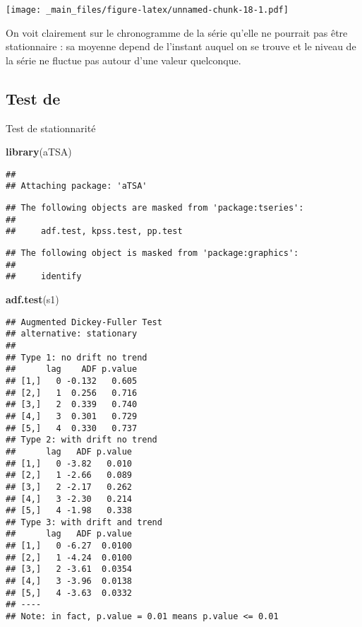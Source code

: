 \documentclass[
]{book}
\newenvironment{Shaded}{\begin{snugshade}}{\end{snugshade}}
\newcommand{\FunctionTok}[1]{\textcolor[rgb]{0.13,0.29,0.53}{\textbf{#1}}}
\newcommand{\NormalTok}[1]{#1}
\theoremstyle{definition}
\theoremstyle{definition}
\theoremstyle{definition}
\theoremstyle{definition}
\theoremstyle{remark}
\begin{document}
\texttt{[image: \_main\_files/figure-latex/unnamed-chunk-18-1.pdf]}

On voit clairement sur le chronogramme de la série qu'elle ne pourrait pas être stationnaire : sa moyenne depend de l'instant auquel on se trouve et le niveau de la série ne fluctue pas autour d'une valeur quelconque.

\hypertarget{test-de}{%
\subsection{Test de}\label{test-de}}

Test de stationnarité

\begin{Shaded}
\begin{Highlighting}[]
\FunctionTok{library}\NormalTok{(aTSA)}
\end{Highlighting}
\end{Shaded}

\begin{verbatim}
## 
## Attaching package: 'aTSA'
\end{verbatim}

\begin{verbatim}
## The following objects are masked from 'package:tseries':
## 
##     adf.test, kpss.test, pp.test
\end{verbatim}

\begin{verbatim}
## The following object is masked from 'package:graphics':
## 
##     identify
\end{verbatim}

\begin{Shaded}
\begin{Highlighting}[]
\FunctionTok{adf.test}\NormalTok{(s1)}
\end{Highlighting}
\end{Shaded}

\begin{verbatim}
## Augmented Dickey-Fuller Test 
## alternative: stationary 
##  
## Type 1: no drift no trend 
##      lag    ADF p.value
## [1,]   0 -0.132   0.605
## [2,]   1  0.256   0.716
## [3,]   2  0.339   0.740
## [4,]   3  0.301   0.729
## [5,]   4  0.330   0.737
## Type 2: with drift no trend 
##      lag   ADF p.value
## [1,]   0 -3.82   0.010
## [2,]   1 -2.66   0.089
## [3,]   2 -2.17   0.262
## [4,]   3 -2.30   0.214
## [5,]   4 -1.98   0.338
## Type 3: with drift and trend 
##      lag   ADF p.value
## [1,]   0 -6.27  0.0100
## [2,]   1 -4.24  0.0100
## [3,]   2 -3.61  0.0354
## [4,]   3 -3.96  0.0138
## [5,]   4 -3.63  0.0332
## ---- 
## Note: in fact, p.value = 0.01 means p.value <= 0.01
\end{verbatim}
\end{document}
